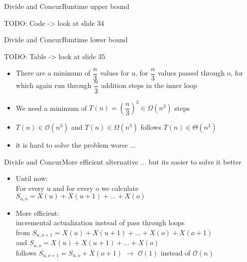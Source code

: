 
\begin{frame}{Divide and Concur}{Runtime upper bound}
	
	TODO: Code -> look at slide 34 \vspace{2em}
	
\end{frame}


\begin{frame}{Divide and Concur}{Runtime lower bound}

TODO: Table -> look at slide 35 \vspace{2em}

	\begin{itemize}
		\item
			There are a minimum of $\dfrac{n}{3}$ values for u, for $\dfrac{n}{3}$ 
			values passed through o, for which again run through $\dfrac{n}{3}$ 
			addition steps in the inner loop
		\item
			We need a minimum of $T(n) = \left(\dfrac{n}{3}\right)^3 \in \Omega 
			(n^3)$ steps
		\item
			$T(n) \in \mathcal{O}(n^3)$ and $T(n) \in \Omega(n^3)$ follows $T(n) \in 
			\Theta (n^3)$
		\item
			it is hard to solve the problem worse ...
	\end{itemize}
\end{frame}


\begin{frame}{Divide and Concur}{More efficient alternative}
	... but its easier to solve it better
	\begin{itemize}
		\item
			Until now:\\
			For every u and for every o we calculate $S_{u,o} = X(u) + X(u+1) + \dots 
			+ X(o)$
		\item
			More efficient:\\
			incremental actualization instead of pass through loops\\
			from $S_{u,o+1} = X(u) + X(u+1) + \dots + X(o) + X(o+1)$\\
			and $S_{u,o} = X(u) + X(u+1) + \dots + X(o)$\\
			follows $S_{u,o+1} = S_{u,o} + X(o+1)$ $\rightarrow$ $\mathcal{O}(1)$ 
			instead of $\mathcal{O}(n)$
	\end{itemize}
\end{frame}

